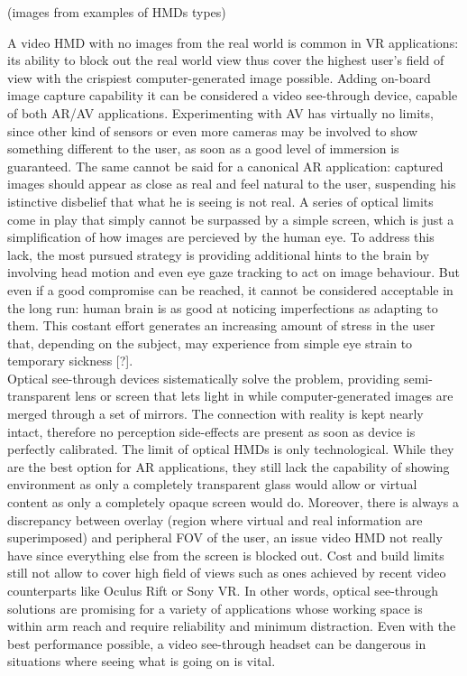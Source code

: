 (images from examples of HMDs types)

A video HMD with no images from the real world is common in VR applications: its ability to block out the real world view thus cover the highest user’s field of view with the crispiest computer-generated image possible. Adding on-board image capture capability it can be considered a video see-through device, capable of both AR/AV applications. Experimenting with AV has virtually no limits, since other kind of sensors or even more cameras may be involved to show something different to the user, as soon as a good level of immersion is guaranteed. The same cannot be said for a canonical AR application: captured images should appear as close as real and feel natural to the user, suspending his istinctive disbelief that what he is seeing is not real. A series of optical limits come in play that simply cannot be surpassed by a simple screen, which is just a simplification of how images are percieved by the human eye. To address this lack, the most pursued strategy is providing additional hints to the brain by involving head motion and even eye gaze tracking to act on image behaviour. But even if a good compromise can be reached, it cannot be considered acceptable in the long run: human brain is as good at noticing imperfections as adapting to them. This costant effort generates an increasing amount of stress in the user that, depending on the subject, may experience from simple eye strain to temporary sickness [?].\\
Optical see-through devices sistematically solve the problem, providing semi-transparent lens or screen that lets light in while computer-generated images are merged through a set of mirrors. The connection with reality is kept nearly intact, therefore no perception side-effects are present as soon as device is perfectly calibrated. The limit of optical HMDs is only technological. While they are the best option for AR applications, they still lack the capability of showing environment as only a completely transparent glass would allow or virtual content as only a completely opaque screen would do. Moreover, there is always a discrepancy between overlay (region where virtual and real information are superimposed) and peripheral FOV of the user, an issue video HMD not really have since everything else from the screen is blocked out. Cost and build limits still not allow to cover high field of views such as ones achieved by recent video counterparts like Oculus Rift or Sony VR. In other words, optical see-through solutions are promising for a variety of applications whose working space is within arm reach and require reliability and minimum distraction. Even with the best performance possible, a video see-through headset can be dangerous in situations where seeing what is going on is vital.\\
